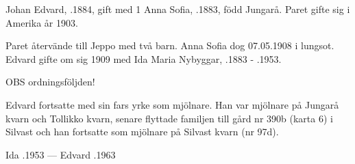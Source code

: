 Johan Edvard, .1884, gift med 1 Anna Sofia, .1883, född Jungarå. Paret gifte sig i Amerika år 1903.
\begin{jhchildren}
  \item {}
  \item {}
  \item {}
\end{jhchildren}
Paret återvände till Jeppo med två barn. Anna Sofia dog 07.05.1908 i lungsot. Edvard gifte om sig 1909 med Ida Maria Nybyggar, .1883  -	.1953.
\begin{jhchildren}
  \item {}
  \item {}
  \item {}  OBS ordningsföljden!
\end{jhchildren}
Edvard fortsatte med sin fars yrke som mjölnare. Han var mjölnare på Jungarå kvarn och Tollikko kvarn, senare flyttade familjen till gård nr 390b (karta 6) i Silvast och han fortsatte som mjölnare på Silvast kvarn (nr 97d).

Ida .1953  ---  Edvard .1963


